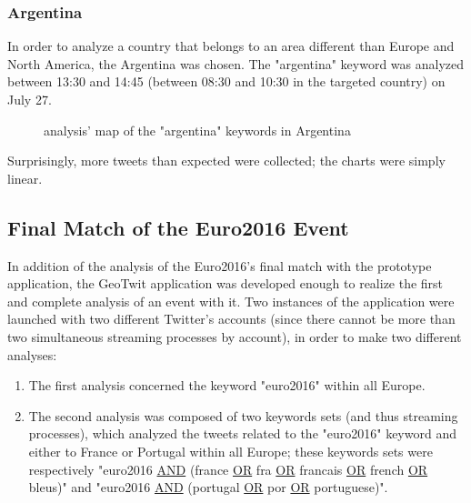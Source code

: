 \documentclass[a4paper,11pt]{report}
\begin{document}
\subsubsection{Argentina}
In order to analyze a country that belongs to an area different than Europe and North America, the Argentina was chosen. The "argentina" keyword was analyzed between 13:30 and 14:45 (between 08:30 and 10:30 in the targeted country) on July 27.
\begin{figure}[H]
\vspace{-5pt}
\begin{center}
\vspace{-20pt}
\caption{analysis' map of the "argentina" keywords in Argentina}
\end{center}
\end{figure}
\vspace{-10pt}
Surprisingly, more tweets than expected were collected; the charts were simply linear.
\bigskip

\subsection{Final Match of the Euro2016 Event}
\label{euro2016final}
In addition of the analysis of the Euro2016's final match with the prototype application, the GeoTwit application was developed enough to realize the first and complete analysis of an event with it. Two instances of the application were launched with two different Twitter's accounts (since there cannot be more than two simultaneous streaming processes by account), in order to make two different analyses:
\begin{enumerate}
	\item The first analysis concerned the keyword "euro2016" within all Europe.
	\item The second analysis was composed of two keywords sets (and thus streaming processes), which analyzed the tweets related to the "euro2016" keyword and either to France or Portugal within all Europe; these keywords sets were respectively "euro2016 \underline{AND} (france \underline{OR} fra \underline{OR} francais \underline{OR} french \underline{OR} bleus)" and "euro2016 \underline{AND} (portugal \underline{OR} por \underline{OR} portuguese)".
\end{enumerate}
\end{document}
